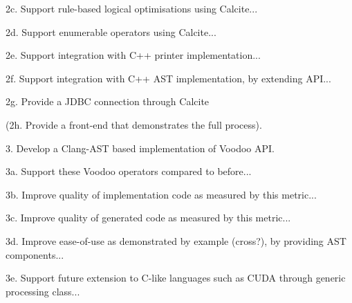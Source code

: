 2c. Support rule-based logical optimisations using Calcite...

2d. Support enumerable operators using Calcite...

2e. Support integration with C++ printer implementation...

2f. Support integration with C++ AST implementation, by extending API...

2g. Provide a JDBC connection through Calcite

(2h. Provide a front-end that demonstrates the full process).

3. Develop a Clang-AST based implementation of Voodoo API.

3a. Support these Voodoo operators compared to before...

3b. Improve quality of implementation code as measured by this metric...

3c. Improve quality of generated code as measured by this metric...

3d. Improve ease-of-use as demonstrated by example (cross?), by providing AST components...

3e. Support future extension to C-like languages such as CUDA through generic processing class...
